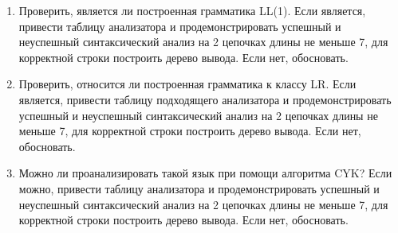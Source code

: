 \documentclass[12pt]{article}
\begin{document}
\begin{enumerate}
  \item Проверить, является ли построенная грамматика LL(1). Если является, привести таблицу анализатора и продемонстрировать успешный и неуспешный синтаксический анализ на 2 цепочках длины не меньше 7, для корректной строки построить дерево вывода. Если нет, обосновать.

  \item Проверить, относится ли построенная грамматика к классу LR. Если является, привести таблицу подходящего анализатора и продемонстрировать успешный и неуспешный синтаксический анализ на 2 цепочках длины не меньше 7, для корректной строки построить дерево вывода. Если нет, обосновать.

  \item Можно ли проанализировать такой язык при помощи алгоритма CYK? Если можно, привести таблицу анализатора и продемонстрировать успешный и неуспешный синтаксический анализ на 2 цепочках длины не меньше 7, для корректной строки построить дерево вывода. Если нет, обосновать.

\end{enumerate}
\end{document}
